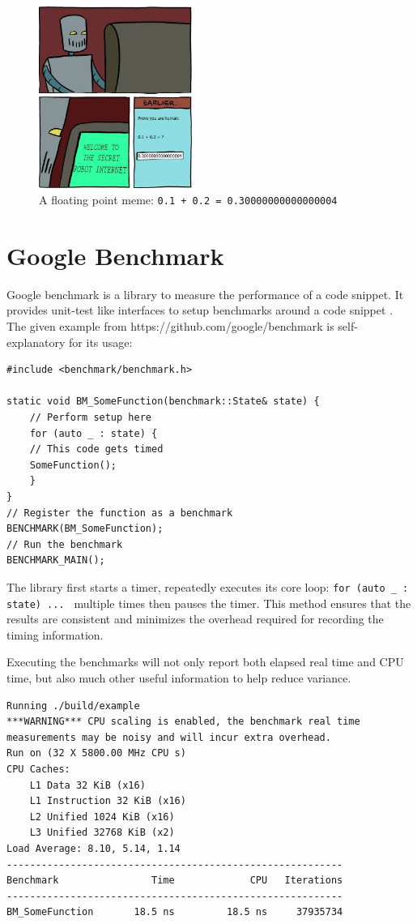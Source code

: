 \documentclass[logo,bsc,singlespacing,parskip]{infthesis}
\begin{document}
\begin{figure}
\begin{center}
    \includegraphics[width=50mm,scale=0.1]{image/0.3004.jpg}
    \caption{A floating point meme: \texttt{0.1 + 0.2 = 0.30000000000000004}}
    \label{meme}
\end{center}
\end{figure}

\section{Google Benchmark}
Google benchmark is a library to measure the performance of a code snippet. It
provides unit-test like interfaces to setup benchmarks around a code snippet
\cite{googlebench}. The given example from https://github.com/google/benchmark
is self-explanatory for its usage: 

\begin{verbatim}
#include <benchmark/benchmark.h>

static void BM_SomeFunction(benchmark::State& state) {
    // Perform setup here
    for (auto _ : state) {
    // This code gets timed
    SomeFunction();
    }
}
// Register the function as a benchmark
BENCHMARK(BM_SomeFunction);
// Run the benchmark
BENCHMARK_MAIN();
\end{verbatim}

The library first starts a timer, repeatedly executes its core loop: \texttt{for
(auto \_ : state) ... } multiple times then pauses the timer. This method
ensures that the results are consistent and minimizes the overhead required for
recording the timing information. 

Executing the benchmarks will not only report both elapsed real time and CPU
time, but also much other useful information to help reduce variance. 
\begin{verbatim}
Running ./build/example
***WARNING*** CPU scaling is enabled, the benchmark real time 
measurements may be noisy and will incur extra overhead.
Run on (32 X 5800.00 MHz CPU s)
CPU Caches:
    L1 Data 32 KiB (x16)
    L1 Instruction 32 KiB (x16)
    L2 Unified 1024 KiB (x16)
    L3 Unified 32768 KiB (x2)
Load Average: 8.10, 5.14, 1.14
----------------------------------------------------------
Benchmark                Time             CPU   Iterations
----------------------------------------------------------
BM_SomeFunction       18.5 ns         18.5 ns     37935734
\end{verbatim}
\end{document}
